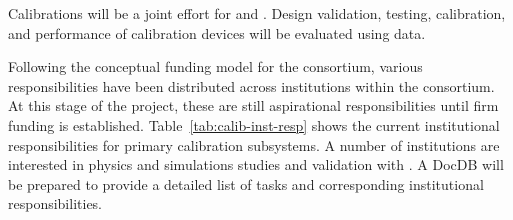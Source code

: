 

Calibrations will be a joint effort for  and . Design validation, testing, calibration, and performance of calibration devices will be evaluated using  data.

Following the conceptual funding model for the consortium, various responsibilities have been distributed across institutions within the consortium. At this stage of the project, these are still aspirational responsibilities until firm funding is established. Table~\ref{tab:calib-inst-resp} shows the current institutional responsibilities for primary calibration subsystems. 
A number of institutions are interested in physics and simulations studies and validation with . A 
 DocDB will be prepared to provide a detailed list of tasks and corresponding institutional responsibilities.


\begin{comment}
\begin{dunetable}
[Institutional responsibility for calibrations]
{p{0.25\textwidth}p{0.65\textwidth}}
{tab:calib-inst-resp}
{Institutional responsibilities in the calibration consortium.}   
System & Institutional Responsibility \\ \toprowrule
Laser System & Bern, Hawaii, LIP, Pitt, UTK \\ \colhline
Pulsed Neutron Source & BU, CSU, UC Davis, Iowa, LIP, MSU, SDSMT \\ \colhline
\end{dunetable}
\end{comment}

